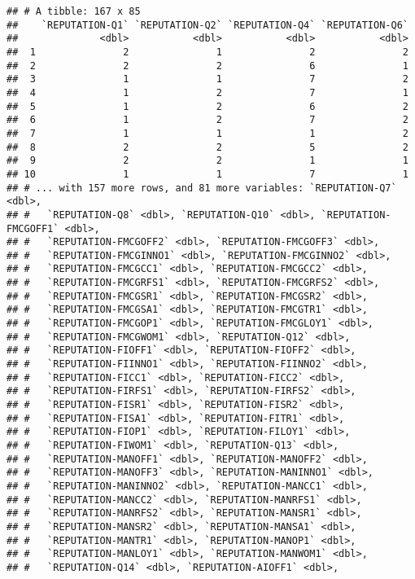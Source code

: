 \documentclass[
]{article}
\begin{document}
\begin{verbatim}
## # A tibble: 167 x 85
##    `REPUTATION-Q1` `REPUTATION-Q2` `REPUTATION-Q4` `REPUTATION-Q6`
##              <dbl>           <dbl>           <dbl>           <dbl>
##  1               2               1               2               2
##  2               2               2               6               1
##  3               1               1               7               2
##  4               1               2               7               1
##  5               1               2               6               2
##  6               1               2               7               2
##  7               1               1               1               2
##  8               2               2               5               2
##  9               2               2               1               1
## 10               1               1               7               1
## # ... with 157 more rows, and 81 more variables: `REPUTATION-Q7` <dbl>,
## #   `REPUTATION-Q8` <dbl>, `REPUTATION-Q10` <dbl>, `REPUTATION-FMCGOFF1` <dbl>,
## #   `REPUTATION-FMCGOFF2` <dbl>, `REPUTATION-FMCGOFF3` <dbl>,
## #   `REPUTATION-FMCGINNO1` <dbl>, `REPUTATION-FMCGINNO2` <dbl>,
## #   `REPUTATION-FMCGCC1` <dbl>, `REPUTATION-FMCGCC2` <dbl>,
## #   `REPUTATION-FMCGRFS1` <dbl>, `REPUTATION-FMCGRFS2` <dbl>,
## #   `REPUTATION-FMCGSR1` <dbl>, `REPUTATION-FMCGSR2` <dbl>,
## #   `REPUTATION-FMCGSA1` <dbl>, `REPUTATION-FMCGTR1` <dbl>,
## #   `REPUTATION-FMCGOP1` <dbl>, `REPUTATION-FMCGLOY1` <dbl>,
## #   `REPUTATION-FMCGWOM1` <dbl>, `REPUTATION-Q12` <dbl>,
## #   `REPUTATION-FIOFF1` <dbl>, `REPUTATION-FIOFF2` <dbl>,
## #   `REPUTATION-FIINNO1` <dbl>, `REPUTATION-FIINNO2` <dbl>,
## #   `REPUTATION-FICC1` <dbl>, `REPUTATION-FICC2` <dbl>,
## #   `REPUTATION-FIRFS1` <dbl>, `REPUTATION-FIRFS2` <dbl>,
## #   `REPUTATION-FISR1` <dbl>, `REPUTATION-FISR2` <dbl>,
## #   `REPUTATION-FISA1` <dbl>, `REPUTATION-FITR1` <dbl>,
## #   `REPUTATION-FIOP1` <dbl>, `REPUTATION-FILOY1` <dbl>,
## #   `REPUTATION-FIWOM1` <dbl>, `REPUTATION-Q13` <dbl>,
## #   `REPUTATION-MANOFF1` <dbl>, `REPUTATION-MANOFF2` <dbl>,
## #   `REPUTATION-MANOFF3` <dbl>, `REPUTATION-MANINNO1` <dbl>,
## #   `REPUTATION-MANINNO2` <dbl>, `REPUTATION-MANCC1` <dbl>,
## #   `REPUTATION-MANCC2` <dbl>, `REPUTATION-MANRFS1` <dbl>,
## #   `REPUTATION-MANRFS2` <dbl>, `REPUTATION-MANSR1` <dbl>,
## #   `REPUTATION-MANSR2` <dbl>, `REPUTATION-MANSA1` <dbl>,
## #   `REPUTATION-MANTR1` <dbl>, `REPUTATION-MANOP1` <dbl>,
## #   `REPUTATION-MANLOY1` <dbl>, `REPUTATION-MANWOM1` <dbl>,
## #   `REPUTATION-Q14` <dbl>, `REPUTATION-AIOFF1` <dbl>,

\end{verbatim}
\end{document}
